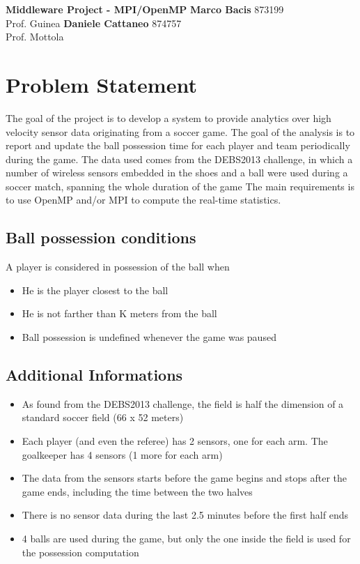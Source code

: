 \documentclass[a4paper, 10pt]{article}
\begin{document}
\noindent
\large\textbf{Middleware Project - MPI/OpenMP} \hfill \textbf{Marco Bacis} 873199 \\
Prof. Guinea \hfill \textbf{Daniele Cattaneo} 874757 \\
Prof. Mottola

\section*{Problem Statement}
The goal of the project is to develop a system to provide analytics over high velocity sensor data originating from a soccer game.
The goal of the analysis is to report and update the ball possession time for each player and team periodically during the game.
The data used comes from the DEBS2013 challenge, in which a number of wireless sensors embedded in the shoes and a ball were used during a soccer match, spanning the whole duration of the game
The main requirements is to use OpenMP and/or MPI to compute the real-time statistics.

\subsection*{Ball possession conditions}
A player is considered in possession of the ball when
\begin{itemize}
\item He is the player closest to the ball
\item He is not farther than K meters from the ball
\item Ball possession is undefined whenever the game was paused
\end{itemize}

\subsection*{Additional Informations}
\begin{itemize}
    \item As found from the DEBS2013 challenge, the field is half the dimension of a standard soccer field (66 x 52 meters)
    \item Each player (and even the referee) has 2 sensors, one for each arm. The goalkeeper has 4 sensors (1 more for each arm)
    \item The data from the sensors starts before the game begins and stops after the game ends, including the time between the two halves
    \item There is no sensor data during the last 2.5 minutes before the first half ends
    \item 4 balls are used during the game, but only the one inside the field is used for the possession computation
\end{itemize}
\end{document}

